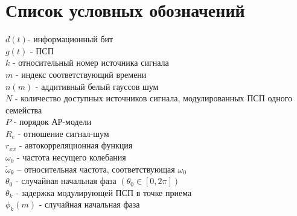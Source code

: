 \chapter*{Список условных обозначений}
\noindent
${d(t)}$- информационный бит \\
${g(t)}$ - ПСП 	\\
${k}$ - относительный номер источника сигнала	\\
${m}$ - индекс соответствующий времени	\\
${n(m)}$ - аддитивный белый гауссов шум \\
${N}$ - количество доступных источников сигнала, модулированных ПСП одного семейства \\
${P}$ - порядок АР-модели \\
${R_e}$ - отношение сигнал-шум \\
${r_{xx}}$ - автокорреляционная функция \\

\noindent
${\omega_0}$ - частота несущего колебания \\
${\tilde{\omega}_{k}}$  – относительная частота, соответствующая ${\omega_0}$ \\
${\theta_0}$ - случайная начальная фаза ${(\theta_0 \in [0, 2\pi])}$ \\
${\theta_k}$ - задержка модулирующей ПСП в точке приема \\
${\phi_k(m)}$ - случайная начальная фаза \\

\newpage
